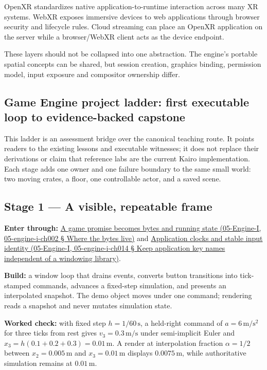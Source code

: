 OpenXR standardizes native application-to-runtime interaction across many XR systems. WebXR exposes immersive devices to web applications through browser security and lifecycle rules. Cloud streaming can place an OpenXR application on the server while a browser/WebXR client acts as the device endpoint.

These layers should not be collapsed into one abstraction. The engine's portable spatial concepts can be shared, but session creation, graphics binding, permission model, input exposure and compositor ownership differ.

\subsection{Game Engine project ladder: first executable loop to evidence-backed capstone}\label{game-engine-project-ladder-first-executable-loop-to-evidence-backed-capstone}

This ladder is an assessment bridge over the canonical teaching route. It points readers to the existing lessons and executable witnesses; it does not replace their derivations or claim that reference labs are the current Kairo implementation. Each stage adds one owner and one failure boundary to the same small world: two moving crates, a floor, one controllable actor, and a saved scene.

\subsection{Stage 1 --- A visible, repeatable frame}\label{stage-1-a-visible-repeatable-frame}

\textbf{Enter through:} \href{}{A game promise becomes bytes and running state (05-Engine-I, 05-engine-i-ch002 § Where the bytes live)} and \href{}{Application clocks and stable input identity (05-Engine-I, 05-engine-i-ch014 § Keep application key names independent of a windowing library)}.

\textbf{Build:} a window loop that drains events, converts button transitions into tick-stamped commands, advances a fixed-step simulation, and presents an interpolated snapshot. The demo object moves under one command; rendering reads a snapshot and never mutates simulation state.

\textbf{Worked check:} with fixed step \(h=1/60\,\mathrm s\), a held-right command of \(a=6\,\mathrm{m/s^2}\) for three ticks from rest gives \(v_3=0.3\,\mathrm{m/s}\) under semi-implicit Euler and \(x_3=h(0.1+0.2+0.3)=0.01\,\mathrm m\). A render at interpolation fraction \(\alpha=1/2\) between \(x_2=0.005\,\mathrm m\) and \(x_3=0.01\,\mathrm m\) displays \(0.0075\,\mathrm m\), while authoritative simulation remains at \(0.01\,\mathrm m\).

